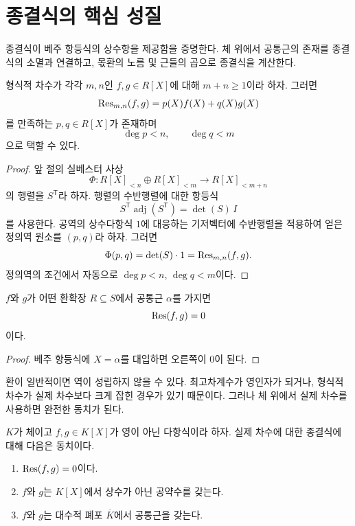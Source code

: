 \clearpage
\section{종결식의 핵심 성질}
\label{sec:resultant-properties}

\begin{learninggoal}
종결식이 베주 항등식의 상수항을 제공함을 증명한다. 체 위에서 공통근의 존재를 종결식의 소멸과 연결하고, 몫환의 노름 및 근들의 곱으로 종결식을 계산한다.
\end{learninggoal}

\begin{theorem}
\label{thm:resultant-bezout}
형식적 차수가 각각 $m,n$인 $f,g\in R[X]$에 대해 $m+n\ge1$이라 하자. 그러면
\[
  \operatorname{Res}_{m,n}(f,g)=p(X)f(X)+q(X)g(X)
\]
를 만족하는 $p,q\in R[X]$가 존재하며
\[
  \deg p<n,
  \qquad
  \deg q<m
\]
으로 택할 수 있다.
\end{theorem}

\begin{proof}
앞 절의 실베스터 사상
\[
  \Phi:R[X]_{<n}\oplus R[X]_{<m}\to R[X]_{<m+n}
\]
의 행렬을 $S^{\mathsf T}$라 하자. 행렬의 수반행렬에 대한 항등식
\[
  S^{\mathsf T}\operatorname{adj}(S^{\mathsf T})
  =\det(S)\,I
\]
를 사용한다. 공역의 상수다항식 $1$에 대응하는 기저벡터에 수반행렬을 적용하여 얻은 정의역 원소를 $(p,q)$라 하자. 그러면
\[
  \Phi(p,q)=\det(S)\cdot1
  =\operatorname{Res}_{m,n}(f,g).
\]
정의역의 조건에서 자동으로 $\deg p<n$, $\deg q<m$이다.
\end{proof}

\begin{corollary}
$f$와 $g$가 어떤 환확장 $R\subseteq S$에서 공통근 $\alpha$를 가지면
\[
  \operatorname{Res}(f,g)=0
\]
이다.
\end{corollary}

\begin{proof}
베주 항등식에 $X=\alpha$를 대입하면 오른쪽이 $0$이 된다.
\end{proof}

환이 일반적이면 역이 성립하지 않을 수 있다. 최고차계수가 영인자가 되거나, 형식적 차수가 실제 차수보다 크게 잡힌 경우가 있기 때문이다. 그러나 체 위에서 실제 차수를 사용하면 완전한 동치가 된다.

\begin{theorem}[체 위의 공통근 판정]
\label{thm:resultant-common-root}
$K$가 체이고 $f,g\in K[X]$가 영이 아닌 다항식이라 하자. 실제 차수에 대한 종결식에 대해 다음은 동치이다.
\begin{enumerate}[label=(\roman*)]
  \item $\operatorname{Res}(f,g)=0$이다.
  \item $f$와 $g$는 $K[X]$에서 상수가 아닌 공약수를 갖는다.
  \item $f$와 $g$는 대수적 폐포 $\overline K$에서 공통근을 갖는다.
\end{enumerate}
\end{theorem}

